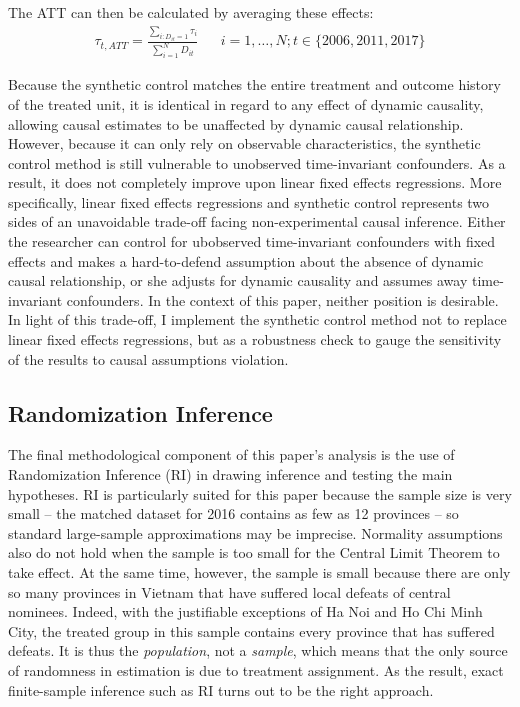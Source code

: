 \documentclass[12pt]{article}\usepackage[]{graphicx}\usepackage[]{color}
\newcommand{\1}{\mathbbm{1}}
\begin{document}
The ATT can then be calculated by averaging these effects:
\begin{align*}
	\tau_{t, ATT} = \frac{\sum_{i: D_{it}=1} \tau_i}{\sum_{i=1}^{N}D_{it}}  && i = 1,\dots,N; t \in \{2006, 2011, 2017\}
\end{align*}

Because the synthetic control matches the entire treatment and outcome history of the treated unit, it is identical in regard to any effect of dynamic causality, allowing causal estimates to be unaffected by dynamic causal relationship. However, because it can only rely on observable characteristics, the synthetic control method is still vulnerable to unobserved time-invariant confounders. As a result, it does not completely improve upon linear fixed effects regressions. More specifically, linear fixed effects regressions and synthetic control represents two sides of an unavoidable trade-off facing non-experimental causal inference. Either the researcher can control for ubobserved time-invariant confounders with fixed effects and makes a hard-to-defend assumption about the absence of dynamic causal relationship, or she adjusts for dynamic causality and assumes away time-invariant confounders. In the context of this paper, neither position is desirable. In light of this trade-off, I implement the synthetic control method not to replace linear fixed effects regressions, but as a robustness check to gauge the sensitivity of the results to causal assumptions violation.

\subsection{Randomization Inference}
\label{sec:ri}
The final methodological component of this paper's analysis is the use of Randomization Inference (RI) in drawing inference and testing the main hypotheses. RI is particularly suited for this paper because the sample size is very small -- the matched dataset for 2016 contains as few as 12 provinces -- so standard large-sample approximations may be imprecise. Normality assumptions also do not hold when the sample is too small for the Central Limit Theorem to take effect. At the same time, however, the sample is small because there are only so many provinces in Vietnam that have suffered local defeats of central nominees. Indeed, with the justifiable exceptions of Ha Noi and Ho Chi Minh City, the treated group in this sample contains every province that has suffered defeats. It is thus the \textit{population}, not a \textit{sample}, which means that the only source of randomness in estimation is due to treatment assignment. As the result, exact finite-sample inference such as RI turns out to be the right approach. 
\end{document}

